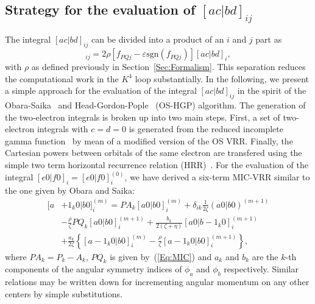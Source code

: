\documentclass[prl,twocolumn,showpacs,twocolumngrid,superbib]{revtex4}
\begin{document}
\subsection{Strategy for the evaluation of $[ac|bd]_{ij}$}
The integral $[ac|bd]_{ij}$ can be divided into a product of an $i$ and $j$ part as
\begin{equation*}
 [ac|bd]_{ij}=2\rho[f_{PQj}-\varepsilon\mathrm{sgn}(f_{PQj}) ][ac|bd]_{i},
\end{equation*}
with $\rho$ as defined previously in Section~\ref{Sec:Formalism}. 
This separation reduces the computational work
in the $K^4$ loop substantially.
In the following, we present a simple approach for the evaluation of
the integral $[ac|bd]_{ij}$ in the spirit of the Obara-Saika~\cite{SObara86}
and Head-Gordon-Pople~\cite{MGordon88} (OS-HGP) algorithm.
The generation of the two-electron integrals is broken up into two
main steps. First, a set of two-electron integrals with $c=d=0$ is generated from the
reduced incomplete gamma function~\cite{IShavitt63} 
by mean of a modified version of the OS VRR. Finally,
the Cartesian powers between orbitals of the same electron are transfered using 
the simple two term horizontal recurrence relation (HRR)~\cite{MGordon88}.
For the evaluation of the integral $[e0|f0]_{i}=[e0|f0]_{i}^{(0)}$, we have 
derived a six-term MIC-VRR similar
to the one given by Obara and Saika:
\begin{equation}\label{Eq:MIC-VRR}
  \begin{split}
    [a&+1_k0|b0]_{i}^{(m)}=
    PA_k[a0|b0]_{i}^{(m)}
    +\delta_{ik}\frac{1}{2\zeta}(a0|b0)^{(m+1)}\\
    &-\frac{\rho}{\zeta}PQ_k[a0|b0]_{i}^{(m+1)}
    +\frac{b_k}{2(\zeta+\eta)}[a0|b-1_k0]_{i}^{(m+1)}\\
    &+\frac{a_k}{2\zeta}
       \left\{
	 [a-1_k0|b0]_{i}^{(m)}-\frac{\rho}{\zeta}[a-1_k0|b0]_{i}^{(m+1)}
       \right\},
  \end{split}
\end{equation}
where $PA_k=P_k-A_k$, $PQ_k$ is given by~(\ref{Eq:MIC})
and $a_k$ and $b_k$ are the $k$-th components of the angular 
symmetry indices of $\phi_a$ and $\phi_b$ respectively. 
Similar relations may be written down for incrementing angular momentum 
on any other centers by simple substitutions.
\end{document}
